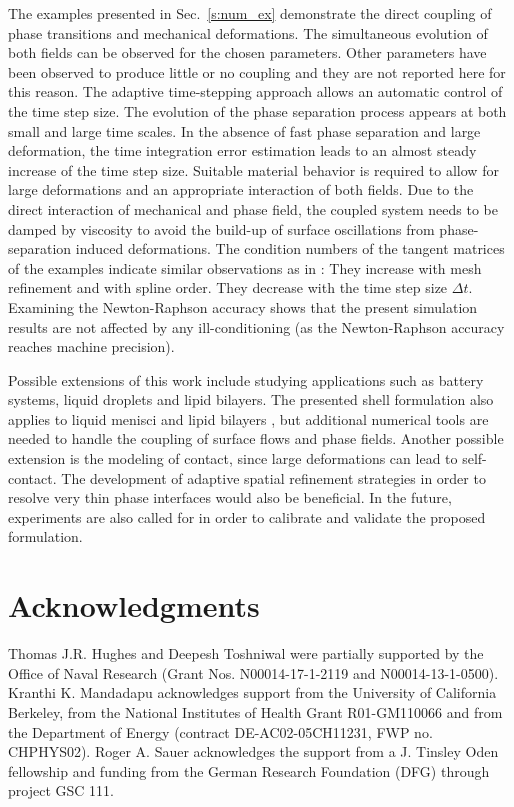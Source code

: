 \documentclass[11pt]{article}
\begin{document}
The examples presented in Sec.~\ref{s:num_ex} demonstrate the direct coupling of phase transitions and mechanical deformations. 
The simultaneous evolution of both fields can be observed for the chosen parameters. 
Other parameters have been observed to produce little or no coupling and they are not reported here for this reason.
The adaptive time-stepping approach allows an automatic control of the time step size. 
The evolution of the phase separation process appears at both small and large time scales. 
In the absence of fast phase separation and large deformation, the time integration error estimation leads to an almost steady increase of the time step size. 
Suitable material behavior is required to allow for large deformations and an appropriate interaction of both fields. 
Due to the direct interaction of mechanical and phase field, the coupled system needs to be damped by viscosity to avoid the build-up of surface oscillations from phase-separation induced deformations. The condition numbers of the tangent matrices of the examples indicate similar observations as in \citet{bartezzaghi16}: They increase with mesh refinement and with spline order. 
They decrease with the time step size $\Delta t$. 
Examining the Newton-Raphson accuracy shows that the present simulation results are not affected by any ill-conditioning (as the Newton-Raphson accuracy reaches machine precision).

Possible extensions of this work include studying applications such as battery systems, liquid droplets and lipid bilayers. 
The presented shell formulation also applies to liquid menisci \citep{droplet} and lipid bilayers \citep{Katira2016,liquidshell}, but additional numerical tools are needed to handle the coupling of surface flows and phase fields. 
Another possible extension is the modeling of contact, since large deformations can lead to self-contact. 
The development of adaptive spatial refinement strategies in order to resolve very thin phase interfaces would also be beneficial. In the future, experiments are also called for in order to calibrate and validate the proposed formulation.


\section*{Acknowledgments}

Thomas J.R. Hughes and Deepesh Toshniwal were partially supported by the Office of Naval Research (Grant Nos. N00014-17-1-2119 and N00014-13-1-0500). Kranthi K. Mandadapu acknowledges support from the University of California Berkeley, from the National Institutes of Health Grant R01-GM110066 and from the Department of Energy (contract DE-AC02-05CH11231, FWP no. CHPHYS02). Roger A. Sauer acknowledges the support from a J. Tinsley Oden fellowship and funding from the German Research Foundation (DFG) through project GSC 111.
\end{document}
